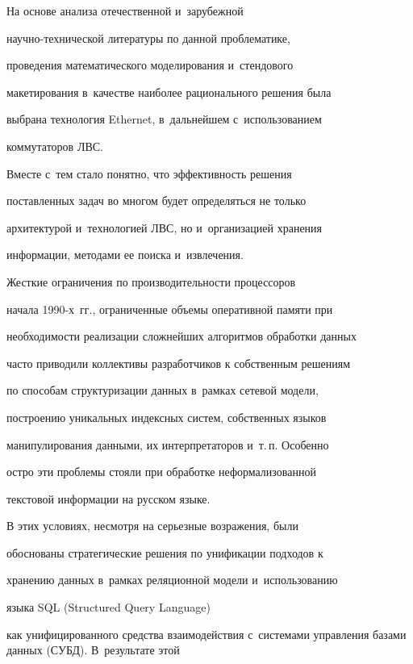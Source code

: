      На основе анализа отечественной и~зарубежной


     на\-уч\-но-тех\-ни\-че\-ской литературы по данной проблематике,


проведения математического моделирования и~стендового


макетирования в~качестве наиболее рационального решения была


выбрана технология Ethernet, в~дальнейшем с~использованием


коммутаторов ЛВС.





     Вместе с~тем стало понятно, что эффективность решения


поставленных задач во многом будет определяться не только


архитектурой и~технологией ЛВС, но и~организацией хранения


информации, методами ее поиска и~извлечения.





     Жесткие ограничения по производительности процессоров


начала 1990-х~гг., ограниченные объемы оперативной памяти при


необходимости реализации сложнейших алгоритмов обработки данных


часто приводили коллективы разработчиков к собственным решениям


по способам структуризации данных в~рамках сетевой модели,


построению уникальных индексных систем, собственных языков


манипулирования данными, их интерпретаторов и~т.\,п. Особенно


остро эти проблемы стояли при обработке неформализованной


текстовой информации на русском языке.





     В этих условиях, несмотря на серьезные возражения, были


обоснованы стратегические решения по унификации подходов к


хранению данных в~рамках реляционной модели и~использованию


языка SQL (Structured Query Language)


как унифицированного средства взаимодействия с~системами управления базами данных (СУБД). В~результате этой


